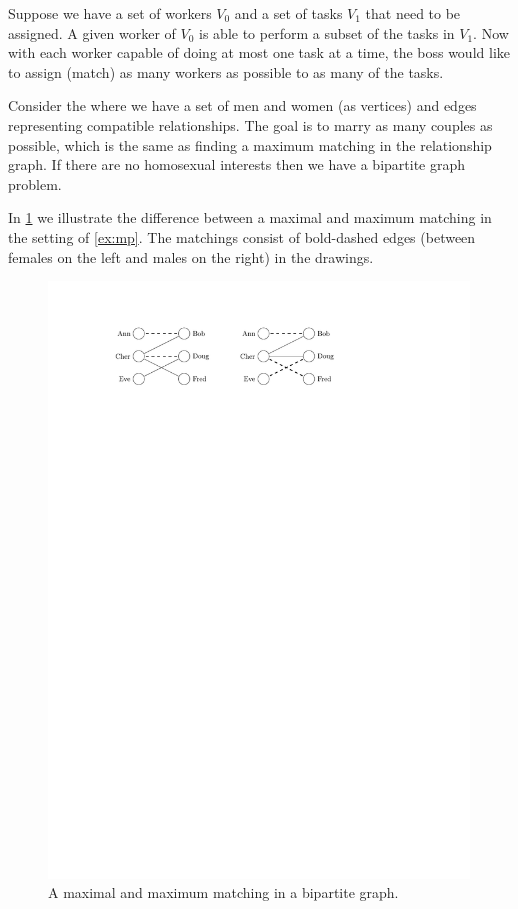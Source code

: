 \begin{Example}
Suppose we have a set of workers $V_0$ and a set of tasks $V_1$ that need to be
assigned.  A given worker of $V_0$ is able to perform a subset of the tasks in $V_1$.
Now with each worker capable of doing at most one task at a time, the boss 
would like to assign (match) as many workers as possible to as many of 
the tasks. 
\end{Example}

\begin{Example}\label{ex:mp}
Consider the  
where we have a set of men and women (as vertices) and edges 
representing compatible 
relationships.  The goal is to marry as many couples
as possible, which is the same as finding a maximum matching in the
relationship graph.  If there are no homosexual interests then we have a 
bipartite graph problem.
\end{Example}

In \cref{fig:matchbipartite} we illustrate the difference between
a maximal and maximum matching in the setting of \cref{ex:mp}.
The matchings consist of bold-dashed edges (between females on the left
and males on the right) in the drawings.

\begin{figure}
\centerline{\includegraphics[width=4.4in]{figs/bipartitematching}}

\caption{A maximal and maximum matching in a bipartite graph.}
\label{fig:matchbipartite}
\end{figure}

